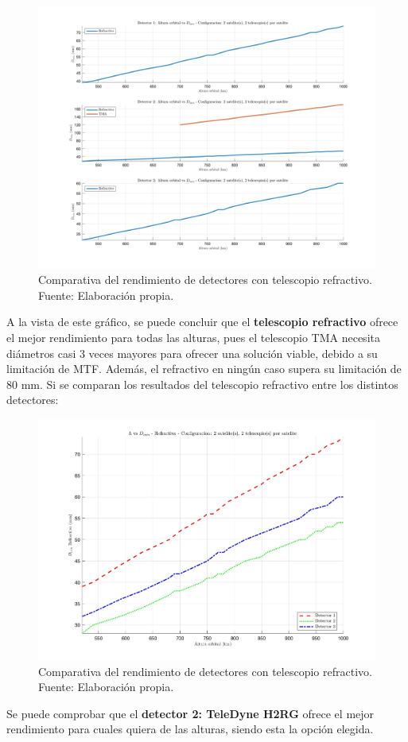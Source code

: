 \begin{figure}[H]
    \centering
    \includegraphics[width=1\linewidth]{4.Payload/HvsDmin_2sat_2tel.jpg}
    \caption{Comparativa del rendimiento de detectores con telescopio refractivo. \\Fuente: Elaboración propia.}
\end{figure}

A la vista de este gráfico, se puede concluir que el \textbf{telescopio refractivo} ofrece el mejor rendimiento para todas las alturas, pues el telescopio TMA necesita diámetros casi 3 veces mayores para ofrecer una solución viable, debido a su limitación de MTF. Además, el refractivo en ningún caso supera su limitación de 80 mm. Si se comparan los resultados del telescopio refractivo entre los distintos detectores:

\begin{figure}[H]
    \centering
    \includegraphics[width=1\linewidth]{4.Payload/HvsDmin_Refractivo_Config_2sat_2tel.jpg}
    \caption{Comparativa del rendimiento de detectores con telescopio refractivo. \\Fuente: Elaboración propia.}
\end{figure}

Se puede comprobar que el \textbf{detector 2: TeleDyne H2RG} ofrece el mejor rendimiento para cuales quiera de las alturas, siendo esta la opción elegida.



